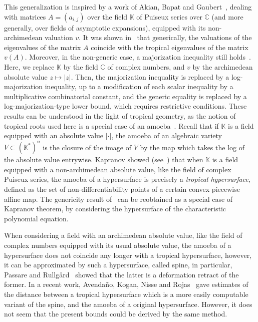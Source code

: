 \documentclass[a4paper]{amsart}
\theoremstyle{definition}
\theoremstyle{plain}
\theoremstyle{remark}
\begin{document}
This generalization is inspired by a work of Akian, Bapat and Gaubert~\cite{abg04,abg04b}, dealing with matrices $A=(a_{i,j})$ over the field $\mathbb{K}$ of Puiseux series over $\mathbb{C}$ (and more generally, over fields of asymptotic expansions), equipped with its non-archimedean valuation $v$. 
It was shown in~\cite[Th.~1.1]{abg04} that generically, the valuations of the eigenvalues
of the matrix $A$ coincide with the tropical eigenvalues
of the matrix $v(A)$. Moreover, in the non-generic case, a majorization inequality still holds~\cite[Th.~3.8]{abg04b}. Here, we replace $\mathbb{K}$ by
the field $\mathbb{C}$ of complex numbers, and $v$ by the archimedean
absolute value $z\mapsto |z|$. Then, the majorization inequality
is replaced by a log-majorization inequality, up to a modification
of each scalar inequality by a multiplicative combinatorial constant,
and the generic equality is replaced by a log-majorization-type
lower bound, which requires
restrictive conditions. These results can be understood in the
light of tropical geometry, as the notion of tropical roots used here is
a special case of an amoeba~\cite{gelfand,passare,kapranov}.
Recall that if $\mathbb{K}$
is a field equipped with an absolute value $|\cdot|$, the amoeba of an algebraic
variety $V \subset (\mathbb{K}^*)^n$ is the closure of the 
image of $V$ by the map
which takes the log of the absolute value entrywise.   
Kapranov showed (see~\cite[Theorem 2.1.1]{kapranov})
that when $\mathbb{K}$ is a field equipped with a non-archimedean
absolute value, like the field of complex Puiseux series, the amoeba
of a hypersurface is precisely a {\em tropical hypersurface},
defined as the set of non-differentiability points of a certain convex piecewise affine map. The genericity result of~\cite{abg04,abg04b} can be reobtained
as a special case of Kapranov theorem, by considering the hypersurface
of the characteristic polynomial equation. 

When considering a field with an archimedean absolute value,
like the field of complex numbers equipped with its usual absolute
value, the amoeba of a hypersurface does not coincide any longer
with a tropical hypersurface, however, it can be approximated
by such a hypersurface, called spine,
in particular, Passare and Rullg{\aa}rd~\cite{passare} showed
that the latter is a deformation retract of the former.
In a recent work, Avenda\~{n}o, Kogan, Nisse and Rojas~\cite{rojas}
gave estimates of the distance between a tropical
hypersurface which is a more easily computable variant
of the spine, and the amoeba of a original hypersurface.  
However, it does not seem that the present bounds could be
derived by the same method.
\end{document}
